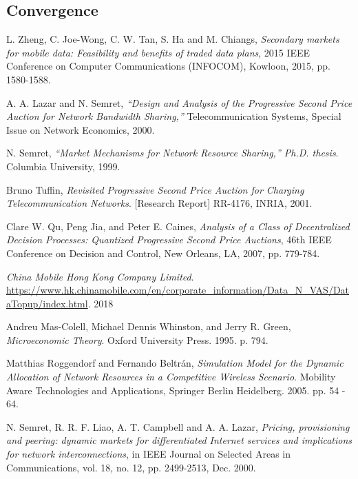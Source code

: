 \documentclass[sigconf, anonymous]{acmart}
\theoremstyle{definition}
\begin{document}
\subsection{Convergence}


\begin{thebibliography}{9}

L. Zheng, C. Joe-Wong, C. W. Tan, S. Ha and M. Chiangs, 
\textit{Secondary markets for mobile data: Feasibility and benefits of traded
data plans}, 2015 IEEE
Conference on Computer Communications (INFOCOM), Kowloon, 2015, pp. 1580-1588.

A. A. Lazar and N. Semret, 
\textit{“Design and Analysis of the Progressive Second Price Auction for Network
Bandwidth Sharing,”} Telecommunication Systems, Special Issue on Network Economics, 2000.

N. Semret, 
\textit{“Market Mechanisms for Network Resource Sharing,”
Ph.D. thesis}. 
Columbia University, 1999.

Bruno Tuffin,
\textit{Revisited Progressive Second Price Auction for Charging
Telecommunication Networks}.
[Research Report] RR-4176, INRIA, 2001.

Clare W. Qu, Peng Jia, and Peter E. Caines,
\textit{Analysis of a Class of Decentralized Decision Processes: Quantized
Progressive Second Price Auctions},
46th IEEE Conference on Decision and Control, New Orleans, LA, 2007, pp.
779-784.

\textit{China Mobile Hong Kong Company Limited}.
\url{https://www.hk.chinamobile.com/en/corporate_information/Data_N_VAS/DataTopup/index.html}.
2018

Andreu Mas-Colell, Michael Dennis Whinston, and Jerry R. Green, 
\textit{Microeconomic Theory}. Oxford University Press. 1995. p. 794.

Matthias Roggendorf and Fernando Beltr{\'a}n,
\textit{Simulation Model for the Dynamic Allocation of Network Resources in a
Competitive Wireless Scenario}. Mobility Aware Technologies and Applications, Springer Berlin Heidelberg. 2005.
pp. 54 - 64.

N. Semret, R. R. F. Liao, A. T. Campbell and A. A. Lazar, 
\textit{Pricing, provisioning and peering: dynamic markets for differentiated Internet services and
implications for network interconnections}, in IEEE Journal on Selected Areas in
Communications, vol. 18, no. 12, pp. 2499-2513, Dec. 2000.

\end{thebibliography}
\end{document}
